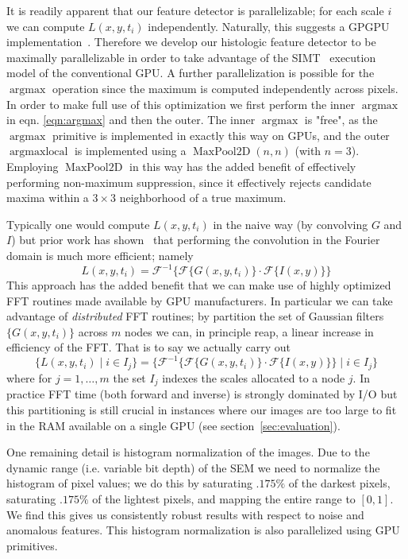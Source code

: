 \documentclass[sigconf,nonacm]{acmart}
\begin{document}
It is readily apparent that our feature detector is parallelizable; for each scale $i$ we can compute $L(x,y,t_i)$ independently.
Naturally, this suggests a GPGPU implementation~\cite{}.
Therefore we develop our histologic feature detector to be maximally parallelizable in order to take advantage of the SIMT~\cite{} execution model of the conventional GPU.
A further parallelization is possible for the $\operatorname*{argmax}$ operation since the maximum is computed independently across pixels. 
In order to make full use of this optimization we first perform the inner $\operatorname*{argmax}$ in eqn. \ref{eqn:argmax} and then the outer.
The inner $\operatorname*{argmax}$ is "free", as the $\operatorname*{argmax}$ primitive is implemented in exactly this way on GPUs, and the outer $\operatorname*{argmaxlocal}$ is implemented using a $\operatorname{MaxPool2D}(n,n)$ (with $n=3$).
Employing $\operatorname{MaxPool2D}$ in this way has the added benefit of effectively performing non-maximum suppression, since it effectively rejects candidate maxima within a $3 \times 3$ neighborhood of a true maximum.

Typically one would compute  $L(x,y,t_{i})$ in the naive way (by convolving $G$ and $I$) but prior work has shown~\cite{citemerfpaper} that performing the convolution in the Fourier domain is much more efficient; namely 
$$
L(x,y,t_i) = \mathcal{F}^{-1} \big\{\mathcal{F}\{G(x,y,t_i)\} \cdot \mathcal{F}\{I(x,y)\} \big\}
$$
This approach has the added benefit that we can make use of highly optimized FFT routines made available by GPU manufacturers.
In particular we can take advantage of \textit{distributed} FFT routines; by partition the set of Gaussian filters $\{ G(x,y,t_i) \}$ across $m$ nodes we can, in principle reap, a linear increase in efficiency of the FFT.
That is to say we actually carry out 
$$
\{ L(x,y,t_i) \mid i \in I_j \} = \big\{ \mathcal{F}^{-1} \{\mathcal{F}\{G(x,y,t_i)\} \cdot \mathcal{F}\{I(x,y)\} \} \mid i \in I_j \big\}
$$
where for $j = 1, \dots, m$ the set $I_j$ indexes the scales allocated to a node $j$.
In practice FFT time (both forward and inverse) is strongly dominated by I/O but this partitioning is still crucial in instances where our images are too large to fit in the RAM available on a single GPU (see section~\ref{sec:evaluation}).

One remaining detail is histogram normalization of the images. 
Due to the dynamic range (i.e. variable bit depth) of the SEM we need to normalize the histogram of pixel values; we do this by saturating $.175\%$ of the darkest pixels, saturating $.175\%$ of the lightest pixels, and mapping the entire range to $[0,1]$.
We find this gives us consistently robust results with respect to noise and anomalous features.
This histogram normalization is also parallelized using GPU primitives.
\end{document}
